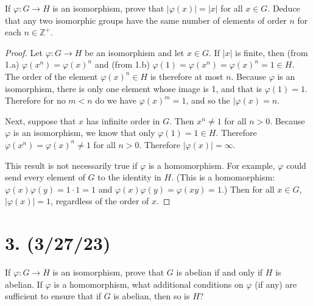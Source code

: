 \documentclass{article}
\begin{document}
If $\varphi: G \rightarrow H$ is an isomorphism, prove that $|\varphi(x)| = |x|$ for all $x \in G$. Deduce that any two isomorphic groups have the same number of elements of order $n$ for each $n \in \mathbb{Z}^+$.

\begin{proof}
    Let $\varphi: G \rightarrow H$ be an isomorphism and let $x \in G$. If $|x|$ is finite, then (from 1.a) $\varphi(x^n) = \varphi(x)^n$ and (from 1.b) $\varphi(1) = \varphi(x^n) = \varphi(x)^n = 1 \in H$. The order of the element $\varphi(x)^n \in H$ is therefore at most $n$. Because $\varphi$ is an isomorphism, there is only one element whose image is 1, and that is $\varphi(1) = 1$. Therefore for no $m < n$ do we have $\varphi(x)^m = 1$, and so the $|\varphi(x) = n$.

    Next, suppose that $x$ has infinite order in $G$. Then $x^n \neq 1$ for all $n > 0$. Because $\varphi$ is an isomorphism, we know that only $\varphi(1) = 1 \in H$. Therefore $\varphi(x^n) = \varphi(x)^n \neq 1$ for all $n > 0$. Therefore $|\varphi(x)| = \infty$.

    This result is not necessarily true if $\varphi$ is a homomorphism. For example, $\varphi$ could send every element of $G$ to the identity in $H$. (This is a homomorphism: $\varphi(x)\varphi(y) = 1 \cdot 1 = 1$ and $\varphi(x)\varphi(y) = \varphi(xy) = 1$.) Then for all $x \in G$, $|\varphi(x)| = 1$, regardless of the order of $x$.
\end{proof}

\section*{3. (3/27/23)}

If $\varphi: G \rightarrow H$ is an isomorphism, prove that $G$ is abelian if and only if $H$ is abelian. If $\varphi$ is a homomorphism, what additional conditions on $\varphi$ (if any) are sufficient to ensure that if $G$ is abelian, then so is $H$?
\end{document}
